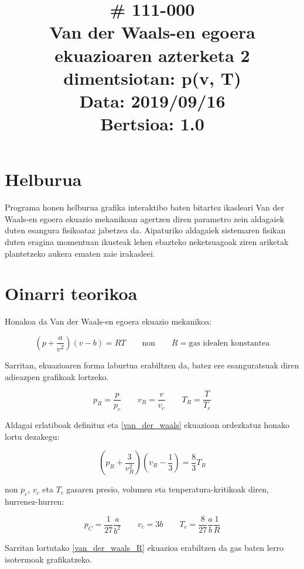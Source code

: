 \documentclass[10pt,a4paper]{article}
\title{\cf \# 111-000 \\ \vspace{5mm}
					Van der Waals-en egoera ekuazioaren azterketa 2 dimentsiotan: p(v, T)\\
\normalsize \vspace{5mm} Data: 2019/09/16 \\
 			\vspace{3mm} Bertsioa: 1.0}
\date{}
\begin{document}
\maketitle
\thispagestyle{fancy}

\section{Helburua}
Programa honen helburua grafika interaktibo baten bitartez ikasleari Van der Waals-en egoera ekuazio mekanikoan agertzen diren parametro zein aldagaiek duten esangura fisikoataz jabetzea da. Aipaturiko aldagaiek sistemaren fisikan duten eragina momentuan ikusteak lehen ebazteko neketsuagoak ziren ariketak plantetzeko aukera ematen zaie irakasleei.
\\

\section{Oinarri teorikoa}
Honakoa da Van der Waals-en egoera ekuazio mekanikoa:

\begin{equation}\label{van_der_waals}
\left( p + \frac{a}{v^2} \right) ( v- b) = RT \qquad \text{non} \qquad R = \text{gas idealen konstantea}
\end{equation}

Sarritan, ekuazioaren forma laburtua erabiltzen da, batez ere esanguratsuak diren adieazpen grafikoak lortzeko.

\begin{equation}
p_R = \frac{p}{p_c} \qquad v_R = \frac{v}{v_c} \qquad T_R = \frac{T}{T_c}
\end{equation}

Aldagai erlatiboak definituz eta \ref{van_der_waals} ekuazioan ordezkatuz honako lortu dezakegu:

\begin{equation}\label{van_der_waals_R}
\left( p_R + \frac{3}{v_R^2} \right) ( v_R - \frac{1}{3}) = \frac{8}{3} T_R 
\end{equation}

non $p_c$, $v_c$ eta $T_c$ gasaren presio, volumen eta tenperatura-kritikoak diren, hurrenez-hurren:

\begin{equation}
p_C = \frac{1}{27} \frac{a}{b^2} \qquad v_c = 3b \qquad T_c = \frac{8}{27}\frac{a}{b}\frac{1}{R}
\end{equation}

Sarritan lortutako \ref{van_der_waals_R} ekuazioa erabiltzen da gas baten lerro isotermoak grafikatzeko. 
\end{document}
